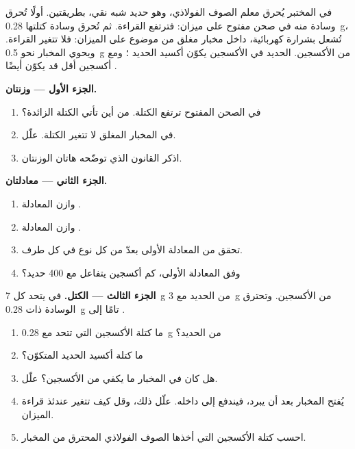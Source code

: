 \begin{problem}
\label{pb:g8:balanced-equations:1}
في المختبر يُحرق معلم الصوف الفولاذي، وهو حديد شبه نقي، بطريقتين. أولًا
تُحرق وسادة منه في صحن مفتوح على ميزان: فترتفع القراءة. ثم تُحرق وسادة
كتلتها \qty{0.28}{g}، تُشعل بشرارة كهربائية، داخل مخبار مغلق من 
موضوع على الميزان: فلا تتغير القراءة. ويحوي المخبار نحو
\qty{0.5}{g} من الأكسجين.  الحديد في الأكسجين يكوّن أكسيد الحديد
؛ ومع أكسجين أقل قد يكوّن أيضًا .

\medskip
\noindent\textbf{الجزء الأول --- وزنتان.}
\begin{enumerate}
  \item في الصحن المفتوح ترتفع الكتلة. من أين تأتي الكتلة
        الزائدة؟
  \item في المخبار المغلق لا تتغير الكتلة. علّل.
  \item اذكر القانون الذي توضّحه هاتان الوزنتان.
\end{enumerate}

\medskip
\noindent\textbf{الجزء الثاني --- معادلتان.}
\begin{enumerate}[resume]
  \item وازن المعادلة . %
  \item وازن المعادلة . %
  \item تحقق من المعادلة الأولى بعدّ  من كل نوع في كل
        طرف.
  \item وفق المعادلة الأولى، كم  أكسجين يتفاعل
        مع 400  حديد؟
\end{enumerate}

\medskip
\noindent\textbf{الجزء الثالث --- الكتل.}
في  يتحد كل \qty{7}{g} من الحديد مع \qty{3}{g} من
الأكسجين. وتحترق الوسادة ذات \qty{0.28}{g}  تامًا إلى .
\begin{enumerate}[resume]
  \item ما كتلة الأكسجين التي تتحد مع \qty{0.28}{g} من الحديد؟
  \item ما كتلة أكسيد الحديد المتكوّن؟
  \item هل كان في المخبار ما يكفي من الأكسجين؟ علّل.
  \item يُفتح المخبار بعد أن يبرد، فيندفع  إلى داخله. علّل ذلك،
        وقل كيف تتغير عندئذ قراءة الميزان.
  \item احسب كتلة الأكسجين التي أخذها الصوف الفولاذي المحترق من 
        المخبار.
\end{enumerate}
\end{problem}
